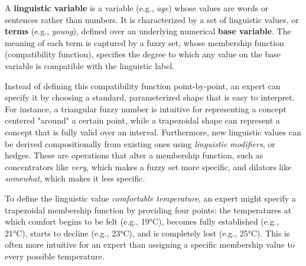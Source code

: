 \begin{definition}
A \textbf{linguistic variable} is a variable (e.g., \emph{age}) whose values are words or sentences rather than numbers. It is characterized by a set of linguistic values, or \textbf{terms} (e.g., \emph{young}), defined over an underlying numerical \textbf{base variable}. The meaning of each term is captured by a fuzzy set, whose membership function (compatibility function), specifies the degree to which any value on the base variable is compatible with the linguistic label.
\end{definition}

Instead of defining this compatibility function point-by-point, an expert can specify it by choosing a standard, parameterized shape that is easy to interpret. For instance, a triangular fuzzy number is intuitive for representing a concept centered "around" a certain point, while a trapezoidal shape can represent a concept that is fully valid over an interval. Furthermore, new linguistic values can be derived compositionally from existing ones using \emph{linguistic modifiers}, or hedges. These are operations that alter a membership function, such as concentrators like \emph{very}, which makes a fuzzy set more specific, and dilators like \emph{somewhat}, which makes it less specific. 

\begin{example}
    To define the linguistic value \emph{comfortable temperature}, an expert might specify a trapezoidal membership function by providing four points: the temperatures at which comfort begins to be felt (e.g., 19°C), becomes fully established (e.g., 21°C), starts to decline (e.g., 23°C), and is completely lost (e.g., 25°C). This is often more intuitive for an expert than assigning a specific membership value to every possible temperature.
\end{example}



